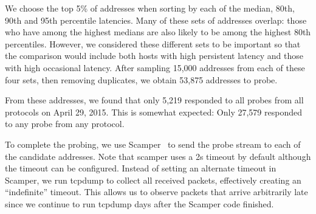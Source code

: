 We choose the top 5\% of addresses when sorting by each of
the median, 80th, 90th and 95th percentile latencies.  Many
of these sets of addresses overlap: those who have among the
highest medians are also likely to be among the highest 80th
percentiles.  However, we considered these different sets to
be important so that the comparison would include both hosts
with high persistent latency and those with high occasional
latency.  After sampling 15,000 addresses from each of these four
sets, then removing duplicates, we obtain 53,875 addresses to probe. 

% 

From these addresses, we found that only 5,219 responded to
all probes from all protocols on April 29, 2015.  This is
somewhat expected: Only 27,579 responded to any probe from any
protocol.  

To complete the probing, we use
Scamper~\cite{luckie2010scamper} to send the probe stream
to each of the 
candidate addresses.
Note that
scamper uses a 2s timeout by default although the
timeout can be configured. Instead of setting an alternate
timeout in Scamper, we run tcpdump to collect all received
packets, effectively creating an ``indefinite'' timeout. This
allows us to observe packets that arrive arbitrarily late
since we continue to run tcpdump days after the Scamper 
code finished.

